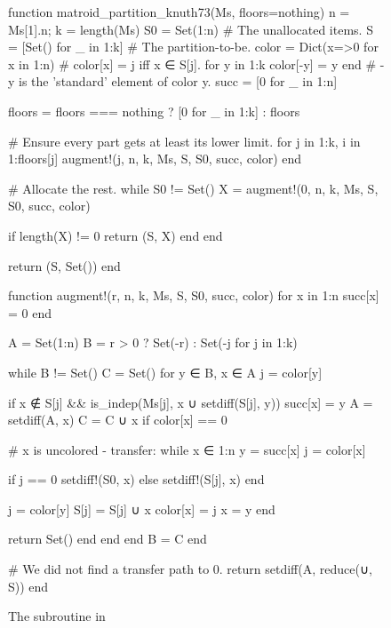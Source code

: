 \begin{figure}
\begin{jllisting}
    
function matroid_partition_knuth73(Ms, floors=nothing)
  n = Ms[1].n; k = length(Ms)
  S0 = Set(1:n) # The unallocated items.
  S = [Set() for _ in 1:k] # The partition-to-be.
  color = Dict(x=>0 for x in 1:n) # color[x] = j iff x ∈ S[j].
  for y in 1:k color[-y] = y end # -y is the 'standard' element of color y.
  succ = [0 for _ in 1:n]

  floors = floors === nothing ? [0 for _ in 1:k] : floors

  # Ensure every part gets at least its lower limit.
  for j in 1:k, i in 1:floors[j]
    augment!(j, n, k, Ms, S, S0, succ, color)
  end

  # Allocate the rest.
  while S0 != Set()
    X = augment!(0, n, k, Ms, S, S0, succ, color)
    
    if length(X) != 0
      return (S, X)
    end
  end

  return (S, Set())
end
    
\end{jllisting}
\caption{}
\label{code:matroid_partition_knuth73}
\end{figure}

\begin{figure}[ht!]
\begin{jllisting}

function augment!(r, n, k, Ms, S, S0, succ, color)
  for x in 1:n succ[x] = 0 end
  
  A = Set(1:n)
  B = r > 0 ? Set(-r) : Set(-j for j in 1:k)
  
  while B != Set()
    C = Set()
    for y ∈ B, x ∈ A
      j = color[y]

      if x ∉ S[j] && is_indep(Ms[j], x ∪ setdiff(S[j], y))
        succ[x] = y
        A = setdiff(A, x)
        C = C ∪ x
        if color[x] == 0 

          # x is uncolored - transfer:
          while x ∈ 1:n
            y = succ[x]
            j = color[x]
            
            if j == 0 setdiff!(S0, x) else setdiff!(S[j], x) end
        
            j = color[y]
            S[j] = S[j] ∪ x
            color[x] = j
            x = y
          end

          return Set() 
        end
      end
    end
    B = C
  end

  # We did not find a transfer path to 0.
  return setdiff(A, reduce(∪, S))
end

\end{jllisting}
\caption{The  subroutine in }
\end{figure}

